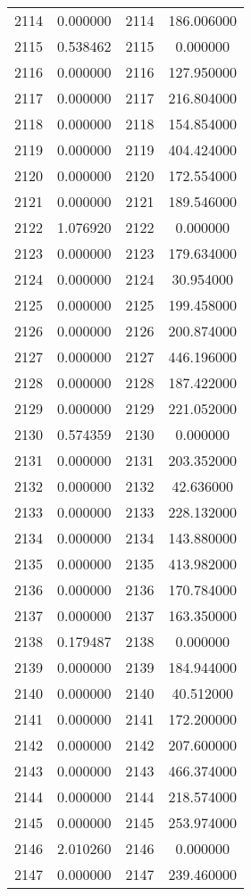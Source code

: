 \documentclass[12pt]{article}
\begin{document}
\begin{longtable}{@{}cccc@{}}
2114 & 0.000000 & 2114 & 186.006000 \\
2115 & 0.538462 & 2115 & 0.000000 \\
2116 & 0.000000 & 2116 & 127.950000 \\
2117 & 0.000000 & 2117 & 216.804000 \\
2118 & 0.000000 & 2118 & 154.854000 \\
2119 & 0.000000 & 2119 & 404.424000 \\
2120 & 0.000000 & 2120 & 172.554000 \\
2121 & 0.000000 & 2121 & 189.546000 \\
2122 & 1.076920 & 2122 & 0.000000 \\
2123 & 0.000000 & 2123 & 179.634000 \\
2124 & 0.000000 & 2124 & 30.954000 \\
2125 & 0.000000 & 2125 & 199.458000 \\
2126 & 0.000000 & 2126 & 200.874000 \\
2127 & 0.000000 & 2127 & 446.196000 \\
2128 & 0.000000 & 2128 & 187.422000 \\
2129 & 0.000000 & 2129 & 221.052000 \\
2130 & 0.574359 & 2130 & 0.000000 \\
2131 & 0.000000 & 2131 & 203.352000 \\
2132 & 0.000000 & 2132 & 42.636000 \\
2133 & 0.000000 & 2133 & 228.132000 \\
2134 & 0.000000 & 2134 & 143.880000 \\
2135 & 0.000000 & 2135 & 413.982000 \\
2136 & 0.000000 & 2136 & 170.784000 \\
2137 & 0.000000 & 2137 & 163.350000 \\
2138 & 0.179487 & 2138 & 0.000000 \\
2139 & 0.000000 & 2139 & 184.944000 \\
2140 & 0.000000 & 2140 & 40.512000 \\
2141 & 0.000000 & 2141 & 172.200000 \\
2142 & 0.000000 & 2142 & 207.600000 \\
2143 & 0.000000 & 2143 & 466.374000 \\
2144 & 0.000000 & 2144 & 218.574000 \\
2145 & 0.000000 & 2145 & 253.974000 \\
2146 & 2.010260 & 2146 & 0.000000 \\
2147 & 0.000000 & 2147 & 239.460000 \\

\end{longtable}
\end{document}
